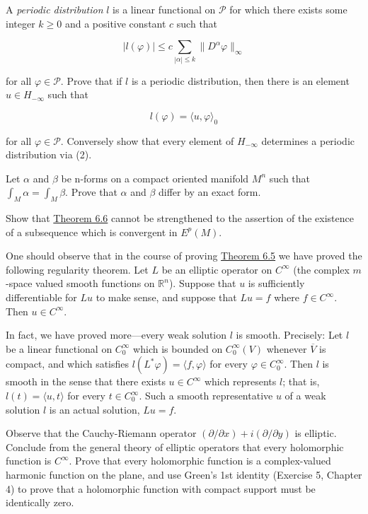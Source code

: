 \begin{problemset}
\item A \emph{periodic distribution} $l$ is a linear functional on $\mathcal{P}$ for which there exists some integer $k \geq 0$ and a positive constant $c$ such that

\begin{equation}
|l(\varphi)|\leq c\sum_{|\alpha|\leq k}\|D^{\alpha}\varphi\|_{\infty}
\end{equation}

for all $\varphi \in \mathcal{P}$. Prove that if $l$ is a periodic distribution, then there is an element $u \in H_{-\infty}$ such that

\begin{equation}
l(\varphi)=\langle u,\varphi\rangle_{0}
\end{equation}

for all $\varphi \in \mathcal{P}$. Conversely show that every element of $H_{-\infty}$ determines a periodic distribution via (2).

\item Let $\alpha$ and $\beta$ be n-forms on a compact oriented manifold  $ M^n $ such that  $ \int_M \alpha = \int_M \beta $. Prove that  $ \alpha $ and  $ \beta $ differ by an exact form.

\item Show that \hyperref[thm:6.6]{Theorem 6.6} cannot be strengthened to the assertion of the existence of a subsequence which is convergent in  $ E^{p}(M) $.

\item One should observe that in the course of proving \hyperref[thm:6.5]{Theorem 6.5} we have proved the following regularity theorem. Let $L$ be an elliptic operator on $C^\infty$ (the complex $m$-space valued smooth functions on $\mathbb{R}^n$). Suppose that $u$ is sufficiently differentiable for $Lu$ to make sense, and suppose that $Lu = f$ where $f \in C^\infty$. Then $u \in C^\infty$.

In fact, we have proved more—every weak solution $l$ is smooth. Precisely: Let $l$ be a linear functional on $C_0^\infty$ which is bounded on $C_0^\infty(V)$ whenever $\overline{V}$ is compact, and which satisfies $l(L^*\varphi) = \langle f, \varphi \rangle$ for every $\varphi \in C_0^\infty$. Then $l$ is smooth in the sense that there exists $u \in C^\infty$ which represents $l$; that is, $l(t) = \langle u, t \rangle$ for every $t \in C_0^\infty$. Such a smooth representative $u$ of a weak solution $l$ is an actual solution, $Lu = f$.

\item Observe that the Cauchy-Riemann operator $(\partial/\partial x) + i(\partial/\partial y)$ is elliptic. Conclude from the general theory of elliptic operators that every holomorphic function is $C^{\infty}$. Prove that every holomorphic function is a complex-valued harmonic function on the plane, and use Green's 1st identity (Exercise 5, Chapter 4) to prove that a holomorphic function with compact support must be identically zero.


\end{problemset}
